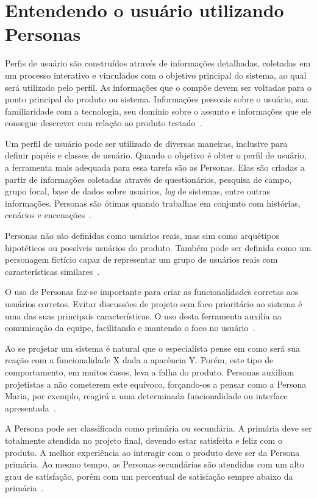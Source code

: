 \section{Entendendo o usuário utilizando Personas}
\label{sec:personas}

Perfis de usuário são construídos através de informações detalhadas, coletadas em um processo interativo e vinculados com o objetivo principal do sistema, ao qual será utilizado pelo perfil. As informações que o compõe devem ser voltadas para o ponto principal do produto ou sistema. Informações pessoais sobre o usuário, sua familiaridade com a tecnologia, seu domínio sobre o assunto e informações que ele consegue descrever com relação ao produto testado~\cite{barbosa:2010}.

Um perfil de usuário pode ser utilizado de diversas maneiras, inclusive para definir papéis e classes de usuário. Quando o objetivo é obter o perfil de usuário, a ferramenta mais adequada para essa tarefa são as Personas. Elas são criadas a partir de informações coletadas através de questionários, pesquisa de campo, grupo focal, base de dados sobre usuários, \emph{log} de sistemas, entre outras informações. Personas são ótimas quando trabalhas em conjunto com histórias, cenários e encenações~\cite{hartson:2012}.

Personas não são definidas como usuários reais, mas sim como arquétipos hipotéticos ou possíveis usuários do produto. Também pode ser definida como um personagem fictício capaz de representar um grupo de usuários reais com características similares~\cite{aquino:2005, barbosa:2010, hartson:2012, masiero:2013}.

O uso de Personas faz-se importante para criar as funcionalidades corretas aos usuários corretos. Evitar discussões de projeto sem foco prioritário ao sistema é uma das suas principais características. O uso desta ferramenta auxilia na comunicação da equipe, facilitando e mantendo o foco no usuário~\cite{aquino:2005, hartson:2012, masiero:2013}.

Ao se projetar um sistema é natural que o especialista pense em como será sua reação com a funcionalidade X dada a aparência Y. Porém, este tipo de comportamento, em muitos casos, leva a falha do produto. Personas auxiliam projetistas a não cometerem este equívoco, forçando-os a pensar como a Persona Maria, por exemplo, reagirá a uma determinada funcionalidade ou interface apresentada~\cite{hartson:2012}.

A Persona pode ser classificada como primária ou secundária. A primária deve ser totalmente atendida no projeto final, devendo estar satisfeita e feliz com o produto. A melhor experiência ao interagir com o produto deve ser da Persona primária. Ao mesmo tempo, as Personas secundárias são atendidas com um alto grau de satisfação, porém com um percentual de satisfação sempre abaixo da primária~\cite{hartson:2012}.

